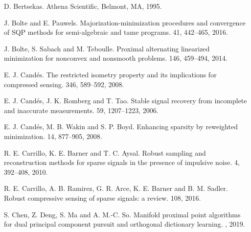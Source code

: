 \documentclass[10pt]{article}
\numberwithin{equation}{section}
\begin{document}
\begin{thebibliography}{99}
D. Bertsekas.
\newblock Athena Scientific, Belmont, MA, 1995.

J. Bolte and E. Pauwels.
\newblock Majorization-minimization procedures and convergence of SQP methods for semi-algebraic and tame programs.
 41, 442--465, 2016.

J. Bolte, S. Sabach and M. Teboulle.
\newblock Proximal alternating linearized minimization for nonconvex and nonsmooth problems.
 146, 459--494, 2014.

%

E. J. Cand\'{e}s.
\newblock The restricted isometry property and its implications for compressed sensing.
 346, 589--592, 2008.

E. J. Cand\'{e}s, J. K. Romberg and T. Tao.
\newblock Stable signal recovery from incomplete and inaccurate measurements.
 59, 1207--1223, 2006.

E. J. Cand\'{e}s, M. B. Wakin and S. P. Boyd.
\newblock Enhancing sparsity by reweighted $\mathop{l_1}$ minimization.
 14, 877--905, 2008.


R. E. Carrillo, K. E. Barner and T. C. Aysal.
\newblock Robust sampling and reconstruction methods for sparse signals in the presence of impulsive noise.
 4, 392--408, 2010.

R. E. Carrillo, A. B. Ramirez, G. R. Arce, K. E. Barner and B. M. Sadler.
\newblock Robust compressive sensing of sparse signals: a review.
 108, 2016.

S. Chen, Z. Deng, S. Ma and A. M.-C. So.
\newblock Manifold proximal point algorithms for dual principal component pursuit and orthogonal dictionary learning.
, 2019.


\end{thebibliography}
\end{document}
